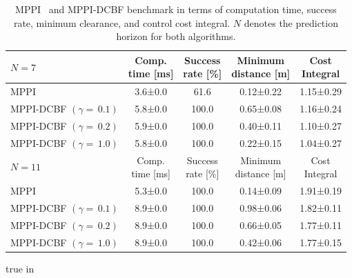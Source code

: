 \documentclass[letterpaper, 10 pt, conference]{ieeeconf}
\begin{document}
\begin{table}[t]
\caption{MPPI~\cite{williams2017model} and MPPI-DCBF benchmark in terms of computation time, success rate, minimum clearance, and control cost integral. $N$ denotes the prediction horizon for both algorithms.}
\label{tab:mppi_eval}
\begin{center}
\begin{tabular}{|l||c|c|c|c|}
\hline
$N=7$ & \shortstack{Comp.\\time [ms]} & \shortstack{Success\\rate [\%]} & \shortstack{Minimum\\distance [m]} & \shortstack{Cost\\Integral} \\
\hline
MPPI & 3.6±0.0 & 61.6 & 0.12±0.22 & 1.15±0.29 \\
\shortstack{MPPI-DCBF\\$(\gamma{=}\,0.1)$} & 5.8±0.0 & 100.0 & 0.65±0.08 & 1.16±0.24 \\
\shortstack{MPPI-DCBF\\$(\gamma{=}\,0.2)$} & 5.9±0.0  & 100.0 & 0.40±0.11 & 1.10±0.27 \\
\shortstack{MPPI-DCBF\\$(\gamma{=}\,1.0)$} & 5.8±0.0  & 100.0 & 0.22±0.15 & 1.04±0.27 \\
\hline
$N=11$ & \shortstack{Comp.\\time [ms]} & \shortstack{Success\\rate [\%]} & \shortstack{Minimum\\distance [m]} & \shortstack{Cost\\Integral} \\
\hline
MPPI & 5.3±0.0 & 100.0 & 0.14±0.09 & 1.91±0.19 \\
\shortstack{MPPI-DCBF\\$(\gamma{=}\,0.1)$} & 8.9±0.0 & 100.0 & 0.98±0.06 & 1.82±0.11 \\
\shortstack{MPPI-DCBF\\$(\gamma{=}\,0.2)$} & 8.9±0.0 & 100.0 & 0.66±0.05 & 1.77±0.11 \\
\shortstack{MPPI-DCBF\\$(\gamma{=}\,1.0)$} & 8.9±0.0 & 100.0 & 0.42±0.06 & 1.77±0.15 \\
\hline
\end{tabular}
\end{center}
 true in
\end{table}
\end{document}
